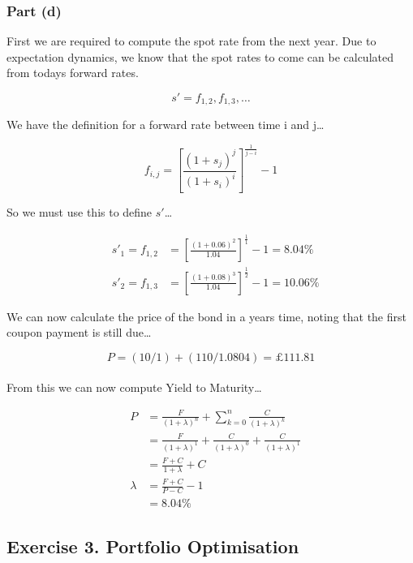 \documentclass[11pt]{article}
\begin{document}
\subsubsection*{Part (d)}

First we are required to compute the spot rate from the next year. Due to expectation dynamics,
we know that the spot rates to come can be calculated from todays forward rates.

\[ s' = f_{1,2}, f_{1,3}, \dots \]

We have the definition for a forward rate between time i and j\dots

\[ f_{i,j} = \left[ \frac{\left(1 + s_{j}\right)^{j}}{\left(1 + s_{i}\right)^{i}} \right]^{\frac{1}{j - i}} - 1 \]

So we must use this to define $s'$\dots

\begin{eqnarray}
  & s'_{1} = f_{1,2} &= \left[ \frac{\left(1 + 0.06\right)^{2}}{1.04} \right]^{\frac{1}{1}} - 1 = 8.04\% \\
  & s'_{2} = f_{1,3} &= \left[ \frac{\left(1 + 0.08\right)^{3}}{1.04} \right]^{\frac{1}{2}} - 1 = 10.06\%
\end{eqnarray}

We can now calculate the price of the bond in a years time, noting that the first coupon payment is still due\dots

\[ P = \left(10 / 1\right) + \left(110 / 1.0804\right) = £111.81 \]
\\
From this we can now compute Yield to Maturity\dots

\begin{eqnarray}
  & P &= \frac{F}{\left(1 + \lambda\right)^{n}} + \sum_{k=0}^{n} \frac{C}{\left(1 + \lambda\right)^{k}} \\[4mm]
  &&= \frac{F}{\left(1 + \lambda\right)^{1}} + \frac{C}{\left(1 + \lambda\right)^{0}} + \frac{C}{\left(1 + \lambda\right)^{1}} \\[4mm]
  &&= \frac{F + C}{1 + \lambda} + C \\[4mm]
  & \lambda &= \frac{F + C}{P - C} - 1 \\[4mm]
  &&= 8.04\%
\end{eqnarray}

\newpage


\subsection*{Exercise 3. Portfolio Optimisation}
\end{document}
